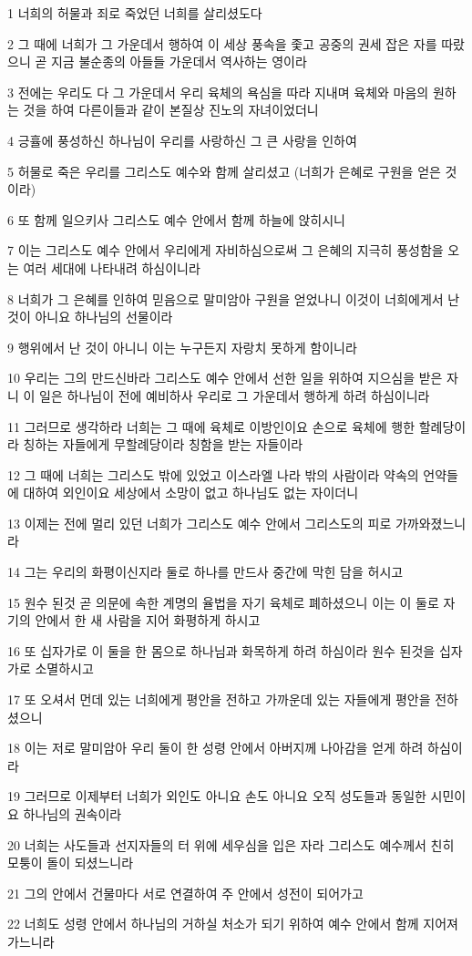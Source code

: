 \par 1 너희의 허물과 죄로 죽었던 너희를 살리셨도다
\par 2 그 때에 너희가 그 가운데서 행하여 이 세상 풍속을 좇고 공중의 권세 잡은 자를 따랐으니 곧 지금 불순종의 아들들 가운데서 역사하는 영이라
\par 3 전에는 우리도 다 그 가운데서 우리 육체의 욕심을 따라 지내며 육체와 마음의 원하는 것을 하여 다른이들과 같이 본질상 진노의 자녀이었더니
\par 4 긍휼에 풍성하신 하나님이 우리를 사랑하신 그 큰 사랑을 인하여
\par 5 허물로 죽은 우리를 그리스도 예수와 함께 살리셨고 (너희가 은혜로 구원을 얻은 것이라)
\par 6 또 함께 일으키사 그리스도 예수 안에서 함께 하늘에 앉히시니
\par 7 이는 그리스도 예수 안에서 우리에게 자비하심으로써 그 은혜의 지극히 풍성함을 오는 여러 세대에 나타내려 하심이니라
\par 8 너희가 그 은혜를 인하여 믿음으로 말미암아 구원을 얻었나니 이것이 너희에게서 난 것이 아니요 하나님의 선물이라
\par 9 행위에서 난 것이 아니니 이는 누구든지 자랑치 못하게 함이니라
\par 10 우리는 그의 만드신바라 그리스도 예수 안에서 선한 일을 위하여 지으심을 받은 자니 이 일은 하나님이 전에 예비하사 우리로 그 가운데서 행하게 하려 하심이니라
\par 11 그러므로 생각하라 너희는 그 때에 육체로 이방인이요 손으로 육체에 행한 할례당이라 칭하는 자들에게 무할례당이라 칭함을 받는 자들이라
\par 12 그 때에 너희는 그리스도 밖에 있었고 이스라엘 나라 밖의 사람이라 약속의 언약들에 대하여 외인이요 세상에서 소망이 없고 하나님도 없는 자이더니
\par 13 이제는 전에 멀리 있던 너희가 그리스도 예수 안에서 그리스도의 피로 가까와졌느니라
\par 14 그는 우리의 화평이신지라 둘로 하나를 만드사 중간에 막힌 담을 허시고
\par 15 원수 된것 곧 의문에 속한 계명의 율법을 자기 육체로 폐하셨으니 이는 이 둘로 자기의 안에서 한 새 사람을 지어 화평하게 하시고
\par 16 또 십자가로 이 둘을 한 몸으로 하나님과 화목하게 하려 하심이라 원수 된것을 십자가로 소멸하시고
\par 17 또 오셔서 먼데 있는 너희에게 평안을 전하고 가까운데 있는 자들에게 평안을 전하셨으니
\par 18 이는 저로 말미암아 우리 둘이 한 성령 안에서 아버지께 나아감을 얻게 하려 하심이라
\par 19 그러므로 이제부터 너희가 외인도 아니요 손도 아니요 오직 성도들과 동일한 시민이요 하나님의 권속이라
\par 20 너희는 사도들과 선지자들의 터 위에 세우심을 입은 자라 그리스도 예수께서 친히 모퉁이 돌이 되셨느니라
\par 21 그의 안에서 건물마다 서로 연결하여 주 안에서 성전이 되어가고
\par 22 너희도 성령 안에서 하나님의 거하실 처소가 되기 위하여 예수 안에서 함께 지어져 가느니라

